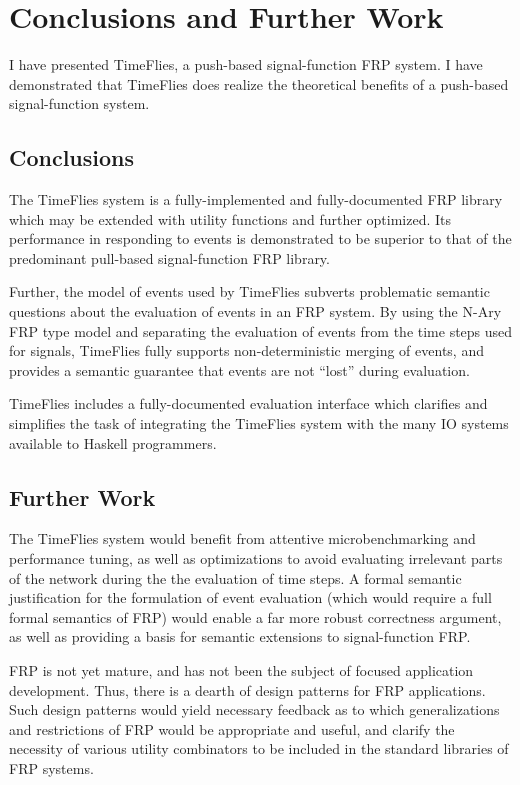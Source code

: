 \chapter{Conclusions and Further Work}
\label{chapter:Conclusions_and_Further_Work}
I have presented TimeFlies, a push-based signal-function FRP system. I have
demonstrated that TimeFlies does realize the theoretical benefits of a
push-based signal-function system.

\section{Conclusions}
\label{section:Conclusions_and_Further_Work-Conclusions}
The TimeFlies system is a fully-implemented and fully-documented FRP library which
may be extended with utility functions and further optimized. Its performance in
responding to events is demonstrated to be superior to that of the predominant
pull-based signal-function FRP library.

Further, the model of events used by TimeFlies subverts problematic semantic
questions about the evaluation of events in an FRP system. By using the N-Ary
FRP type model and separating the evaluation of events from the time steps used
for signals, TimeFlies fully supports non-deterministic merging of events,
and provides a semantic guarantee that events are not ``lost'' during evaluation.

TimeFlies includes a fully-documented evaluation interface which clarifies and
simplifies the task of integrating the TimeFlies system with the many IO systems
available to Haskell programmers.

\section{Further Work}
\label{section:Conclusions_and_Further_Work-Further_Work}
The TimeFlies system would benefit from attentive microbenchmarking and performance
tuning, as well as optimizations to avoid evaluating irrelevant parts of the network
during the the evaluation of time steps. A formal semantic justification for the
formulation of event evaluation (which would require a full formal semantics of FRP)
would enable a far more robust correctness argument, as well as providing a basis for
semantic extensions to signal-function FRP.

FRP is not yet mature, and has not been the subject of focused application development.
Thus, there is a dearth of design patterns for FRP applications. Such design patterns
would yield necessary feedback as to which generalizations and restrictions of FRP would
be appropriate and useful, and clarify the necessity of various utility combinators to
be included in the standard libraries of FRP systems.

